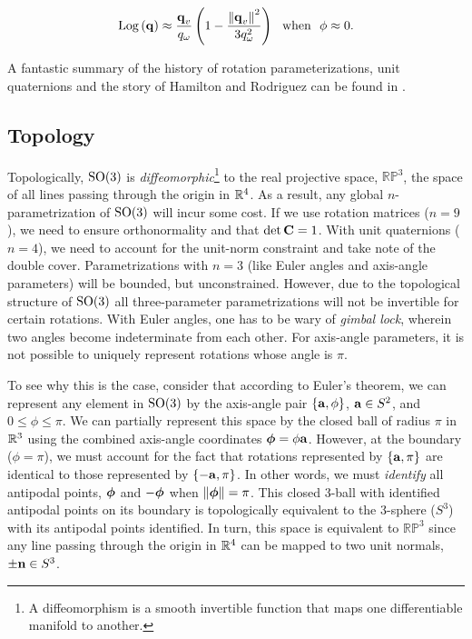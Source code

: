 \begin{equation}
	\mathrm{Log}\left({\boldsymbol{\mathbf{q}}}\right) \approx \frac{\boldsymbol{\mathbf{q}}_v}{q_\omega} \left( 1 - \frac{\left\Vert\boldsymbol{\mathbf{q}}_v\right\Vert^2}{3 q_\omega^2}\right) ~~ \textrm{when} ~~ \phi \approx 0. 
\end{equation}

A fantastic summary of the history of rotation parameterizations, unit quaternions and the story of Hamilton and Rodriguez can be found in \cite{Altmann1989-ru}.

\subsection{Topology}
Topologically, $\mathrm{SO}(3)$ is \textit{diffeomorphic}\footnote{A diffeomorphism is a smooth invertible function that maps one differentiable manifold to another.} to the real projective space, $\mathbb{RP}^3$, the space of all lines passing through the origin in $\RealNumbers^4$. As a result, any global $n$-parametrization of $\mathrm{SO}(3)$ will incur some cost. If we use rotation matrices ($n = 9$), we need to ensure orthonormality and that $\det \boldsymbol{\mathbf{C}} = 1$. With unit quaternions ($n = 4$), we need to account for the unit-norm constraint and take note of the double cover. Parametrizations with $n=3$ (like Euler angles and axis-angle parameters) will be bounded, but unconstrained. However, due to the topological structure of $\mathrm{SO}(3)$ all three-parameter parametrizations will not be invertible for certain rotations. With Euler angles, one has to be wary of \textit{gimbal lock}, wherein two angles become indeterminate from each other. For axis-angle parameters, it is not possible to uniquely represent rotations whose angle is $\pi$. 
 
To see why this is the case, consider that according to Euler's theorem, we can represent any element in $\mathrm{SO}(3)$ by the axis-angle pair $\{\boldsymbol{\mathbf{a}}, \phi\}$, $\boldsymbol{\mathbf{a}} \in S^2$, and $0 \leq \phi \leq \pi$. We can partially represent this space by the closed ball of radius $\pi$ in $\RealNumbers{}^3$ using the combined axis-angle coordinates $\boldsymbol{\mathbf{\phi}} = \phi \boldsymbol{\mathbf{a}}$. However, at the boundary ($\phi = \pi$), we must account for the fact that rotations represented by $\{\boldsymbol{\mathbf{a}}, \pi\}$ are identical to those represented by $\{-\boldsymbol{\mathbf{a}}, \pi\}$. In other words, we must \textit{identify} all antipodal points, $\boldsymbol{\mathbf{\phi}}$ and $-\boldsymbol{\mathbf{\phi}}$ when $\left\Vert\boldsymbol{\mathbf{\phi}}\right\Vert = \pi$. This closed 3-ball with identified antipodal points on its boundary is topologically equivalent to the 3-sphere ($S^3$) with its antipodal points identified. In turn, this space is equivalent to $\mathbb{RP}^3$ since any line passing through the origin in $\RealNumbers^4$ can be mapped to two unit normals, $\pm \boldsymbol{\mathbf{n}} \in S^3$.

